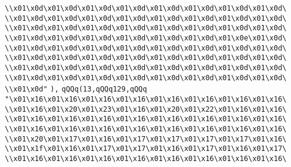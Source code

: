 \verb|\\x01\x0d\x01\x0d\x01\x0d\x01\x0d\x01\x0d\x01\x0d\x01\x0d\x01\x0d\|\newline
\verb|\\x01\x0d\x01\x0d\x01\x0d\x01\x0d\x01\x0d\x01\x0d\x01\x0d\x01\x0d\|\newline
\verb|\\x01\x0d\x01\x0d\x01\x0d\x01\x0d\x01\x0d\x01\x0d\x01\x0d\x01\x0d\|\newline
\verb|\\x01\x0d\x01\x0d\x01\x0d\x01\x0d\x01\x0d\x01\x0d\x01\x0e\x01\x0d\|\newline
\verb|\\x01\x0d\x01\x0d\x01\x0d\x01\x0d\x01\x0d\x01\x0d\x01\x0d\x01\x0d\|\newline
\verb|\\x01\x0d\x01\x0d\x01\x0d\x01\x0d\x01\x0d\x01\x0d\x01\x0d\x01\x0d\|\newline
\verb|\\x01\x0d\x01\x0d\x01\x0d\x01\x0d\x01\x0d\x01\x0d\x01\x0d\x01\x0d\|\newline
\verb|\\x01\x0d\x01\x0d\x01\x0d\x01\x0d\x01\x0d\x01\x0d\x01\x0d\x01\x0d\|\newline
\verb|\\x01\x0d"|\newline
\verb|),|\newline
\verb|qQQq(13,qQQq129,qQQq|\newline
\verb|"\x01\x16\x01\x16\x01\x16\x01\x16\x01\x16\x01\x16\x01\x16\x01\x16\|\newline
\verb|\\x01\x16\x01\x20\x01\x23\x01\x16\x01\x20\x01\x22\x01\x16\x01\x16\|\newline
\verb|\\x01\x16\x01\x16\x01\x16\x01\x16\x01\x16\x01\x16\x01\x16\x01\x16\|\newline
\verb|\\x01\x16\x01\x16\x01\x16\x01\x16\x01\x16\x01\x16\x01\x16\x01\x16\|\newline
\verb|\\x01\x20\x01\x17\x01\x16\x01\x17\x01\x17\x01\x17\x01\x17\x01\x16\|\newline
\verb|\\x01\x1f\x01\x16\x01\x17\x01\x17\x01\x16\x01\x17\x01\x16\x01\x17\|\newline
\verb|\\x01\x16\x01\x16\x01\x16\x01\x16\x01\x16\x01\x16\x01\x16\x01\x16\|\newline
